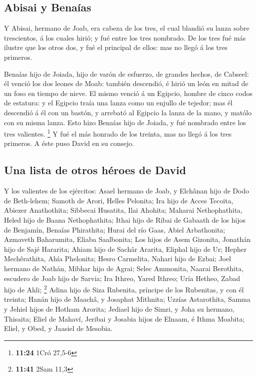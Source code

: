\hypertarget{abisai-y-benauxedas}{%
\subsection{Abisai y Benaías}\label{abisai-y-benauxedas}}

 Y Abisai, hermano de Joab, era cabeza de los tres, el cual
blandió su lanza sobre trescientos, á los cuales hirió; y fué entre los
tres nombrado.  De los tres fué más ilustre que los otros
dos, y fué el principal de ellos: mas no llegó á los tres primeros.

 Benaías hijo de Joiada, hijo de varón de esfuerzo, de
grandes hechos, de Cabseel: él venció los dos leones de Moab: también
descendió, é hirió un león en mitad de un foso en tiempo de nieve.
 El mismo venció á un Egipcio, hombre de cinco codos de
estatura: y el Egipcio traía una lanza como un enjullo de tejedor; mas
él descendió á él con un bastón, y arrebató al Egipcio la lanza de la
mano, y matólo con su misma lanza.  Esto hizo Benaías hijo
de Joiada, y fué nombrado entre los tres valientes. \footnote{\textbf{11:24}
  1Cró 27,5-6}  Y fué el más honrado de los treinta, mas no
llegó á los tres primeros. A éste puso David en su consejo.

\hypertarget{una-lista-de-otros-huxe9roes-de-david}{%
\subsection{Una lista de otros héroes de
David}\label{una-lista-de-otros-huxe9roes-de-david}}

 Y los valientes de los ejércitos: Asael hermano de Joab, y
Elchânan hijo de Dodo de Beth-lehem;  Samoth de Arori,
Helles Pelonita;  Ira hijo de Acces Tecoita, Abiezer
Anathothita;  Sibbecai Husatita, Ilai Ahohita;
 Maharai Nethophathita, Heled hijo de Baana Nethophathita;
 Ithai hijo de Ribai de Gabaath de los hijos de Benjamín,
Benaías Phirathita;  Hurai del río Gaas, Abiel Arbathonita;
 Azmaveth Baharumita, Eliaba Saalbonita;  Los
hijos de Asem Gizonita, Jonathán hijo de Sajé Hararita; 
Ahiam hijo de Sachâr Ararita, Eliphal hijo de Ur;  Hepher
Mechêrathita, Ahía Phelonita;  Hesro Carmelita, Nahari hijo
de Ezbai;  Joel hermano de Nathán, Mibhar hijo de Agrai;
 Selec Ammonita, Naarai Berothita, escudero de Joab hijo de
Sarvia;  Ira Ithreo, Yared Ithreo;  Uría
Hetheo, Zabad hijo de Ahli; \footnote{\textbf{11:41} 2Sam 11,3}
 Adina hijo de Siza Rubenita, príncipe de los Rubenitas, y
con él treinta;  Hanán hijo de Maachâ, y Josaphat Mithnita;
 Uzzías Astarothita, Samma y Jehiel hijos de Hotham
Arorita;  Jediael hijo de Simri, y Joha su hermano,
Thisaita;  Eliel de Mahaví, Jeribai y Josabia hijos de
Elnaam, é Ithma Moabita;  Eliel, y Obed, y Jaasiel de
Mesobia.

